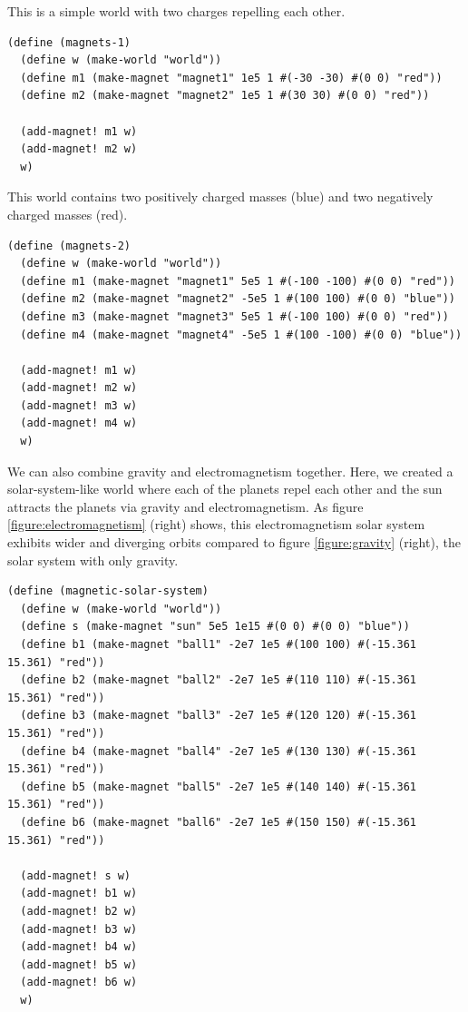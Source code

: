 \documentclass{article}
\begin{document}
This is a simple world with two charges repelling each other.

{\small\begin{verbatim}
(define (magnets-1)
  (define w (make-world "world"))
  (define m1 (make-magnet "magnet1" 1e5 1 #(-30 -30) #(0 0) "red"))
  (define m2 (make-magnet "magnet2" 1e5 1 #(30 30) #(0 0) "red"))

  (add-magnet! m1 w)
  (add-magnet! m2 w)
  w)
\end{verbatim}}


This world contains two positively charged masses (blue) and two negatively
charged masses (red).

{\small\begin{verbatim}
(define (magnets-2)
  (define w (make-world "world"))
  (define m1 (make-magnet "magnet1" 5e5 1 #(-100 -100) #(0 0) "red"))
  (define m2 (make-magnet "magnet2" -5e5 1 #(100 100) #(0 0) "blue"))
  (define m3 (make-magnet "magnet3" 5e5 1 #(-100 100) #(0 0) "red"))
  (define m4 (make-magnet "magnet4" -5e5 1 #(100 -100) #(0 0) "blue"))

  (add-magnet! m1 w)
  (add-magnet! m2 w)
  (add-magnet! m3 w)
  (add-magnet! m4 w)
  w)
\end{verbatim}}


We can also combine gravity and electromagnetism together. Here, we created a
solar-system-like world where each of the planets repel each other and the sun
attracts the planets via gravity and electromagnetism. As figure
\ref{figure:electromagnetism} (right) shows, this electromagnetism solar system
exhibits wider and diverging orbits compared to figure \ref{figure:gravity}
(right), the solar system with only gravity. 

{\small\begin{verbatim}
(define (magnetic-solar-system)
  (define w (make-world "world"))
  (define s (make-magnet "sun" 5e5 1e15 #(0 0) #(0 0) "blue"))
  (define b1 (make-magnet "ball1" -2e7 1e5 #(100 100) #(-15.361 15.361) "red"))
  (define b2 (make-magnet "ball2" -2e7 1e5 #(110 110) #(-15.361 15.361) "red"))
  (define b3 (make-magnet "ball3" -2e7 1e5 #(120 120) #(-15.361 15.361) "red"))
  (define b4 (make-magnet "ball4" -2e7 1e5 #(130 130) #(-15.361 15.361) "red"))
  (define b5 (make-magnet "ball5" -2e7 1e5 #(140 140) #(-15.361 15.361) "red"))
  (define b6 (make-magnet "ball6" -2e7 1e5 #(150 150) #(-15.361 15.361) "red"))

  (add-magnet! s w)
  (add-magnet! b1 w)
  (add-magnet! b2 w)
  (add-magnet! b3 w)
  (add-magnet! b4 w)
  (add-magnet! b5 w)
  (add-magnet! b6 w)
  w)
\end{verbatim}}
\end{document}
